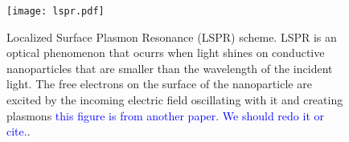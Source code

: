 
\begin{figure}[h] %
   \centering
   \texttt{[image: lspr.pdf]} 
   \caption{Localized Surface Plasmon Resonance (LSPR) scheme. LSPR is an 
            optical phenomenon that ocurrs when light shines on conductive 
            nanoparticles that are smaller than the wavelength of the incident 
            light. The free electrons on the surface of the nanoparticle are 
            excited by the incoming electric field oscillating with it and 
            creating plasmons \textcolor{blue}{this figure is from another paper. We should redo it or cite.}.}
   \label{fig:lspr}
\end{figure}




